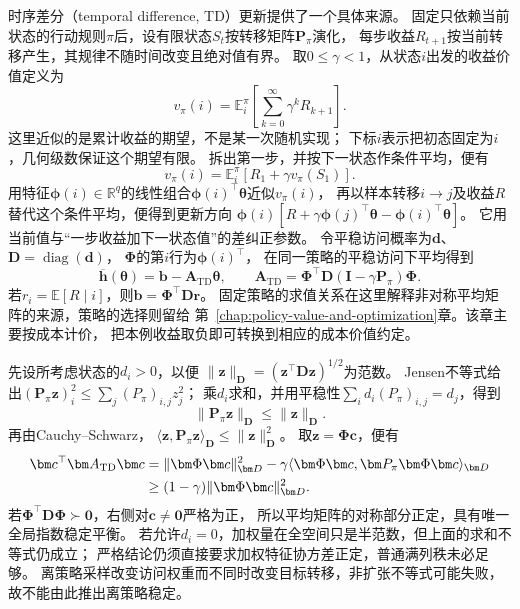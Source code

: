 时序差分（temporal difference, TD）更新提供了一个具体来源。
固定只依赖当前状态的行动规则$\pi$后，设有限状态$S_t$按转移矩阵$\bm P_\pi$演化，
每步收益$R_{t+1}$按当前转移产生，其规律不随时间改变且绝对值有界。
取$0\leq\gamma<1$，从状态$i$出发的收益价值定义为
\[
 v_\pi(i)=\mathbb E_i^\pi
 \left[\sum_{k=0}^\infty\gamma^kR_{k+1}\right].
\]
这里近似的是累计收益的期望，不是某一次随机实现；
下标$i$表示把初态固定为$i$，几何级数保证这个期望有限。
拆出第一步，并按下一状态作条件平均，便有
\[
 v_\pi(i)=\mathbb E_i^\pi[R_1+\gamma v_\pi(S_1)].
\]
用特征$\bm\phi(i)\in\mathbb R^q$的线性组合$\bm\phi(i)^\top\bm\theta$近似$v_\pi(i)$，
再以样本转移$i\to j$及收益$R$替代这个条件平均，便得到更新方向
$\bm\phi(i)[R+\gamma\bm\phi(j)^\top\bm\theta-\bm\phi(i)^\top\bm\theta]$。
它用当前值与“一步收益加下一状态值”的差纠正参数。
令平稳访问概率为$\bm d$、$\bm D=\operatorname{diag}(\bm d)$，
$\bm\Phi$的第$i$行为$\bm\phi(i)^\top$，
在同一策略的平稳访问下平均得到
\begin{equation}
  \overline{\bm h}(\bm\theta)=\bm b-\bm A_{\mathrm{TD}}\bm\theta,\qquad
  \bm A_{\mathrm{TD}}=\bm\Phi^\top\bm D
                    (\bm I-\gamma\bm P_\pi)\bm\Phi.
  \label{eq:dynamical-td-mean-matrix}
\end{equation}
若$r_i=\mathbb E[R\mid i]$，则$\bm b=\bm\Phi^\top\bm D\bm r$。
固定策略的求值关系在这里解释非对称平均矩阵的来源，策略的选择则留给
第~\ref{chap:policy-value-and-optimization}章。该章主要按成本计价，
把本例收益取负即可转换到相应的成本价值约定。

先设所考虑状态的$d_i>0$，以便
$\|\bm z\|_{\bm D}=(\bm z^\top\bm D\bm z)^{1/2}$为范数。
Jensen不等式给出$(\bm P_\pi\bm z)_i^2\leq\sum_j(P_\pi)_{i,j}z_j^2$；
乘$d_i$求和，并用平稳性$\sum_id_i(P_\pi)_{i,j}=d_j$，得到
\begin{equation}
  \|\bm P_\pi\bm z\|_{\bm D}\leq\|\bm z\|_{\bm D}.
  \label{eq:dynamical-markov-contraction-weighted}
\end{equation}
再由Cauchy--Schwarz，
$\langle\bm z,\bm P_\pi\bm z\rangle_{\bm D}\leq\|\bm z\|_{\bm D}^2$。
取$\bm z=\bm\Phi\bm c$，便有
\begin{align}
  \bm c^\top\bm A_{\mathrm{TD}}\bm c
    &=\|\bm\Phi\bm c\|_{\bm D}^2
       -\gamma\langle\bm\Phi\bm c,\bm P_\pi\bm\Phi\bm c\rangle_{\bm D}\notag\\
    &\geq(1-\gamma)\|\bm\Phi\bm c\|_{\bm D}^2.
    \label{eq:dynamical-td-positive-drift}
\end{align}
若$\bm\Phi^\top\bm D\bm\Phi\succ\bm0$，右侧对$\bm c\neq\bm0$严格为正，
所以平均矩阵的对称部分正定，具有唯一全局指数稳定平衡。
若允许$d_i=0$，加权量在全空间只是半范数，但上面的求和不等式仍成立；
严格结论仍须直接要求加权特征协方差正定，普通满列秩未必足够。
离策略采样改变访问权重而不同时改变目标转移，非扩张不等式可能失败，
故不能由此推出离策略稳定。

